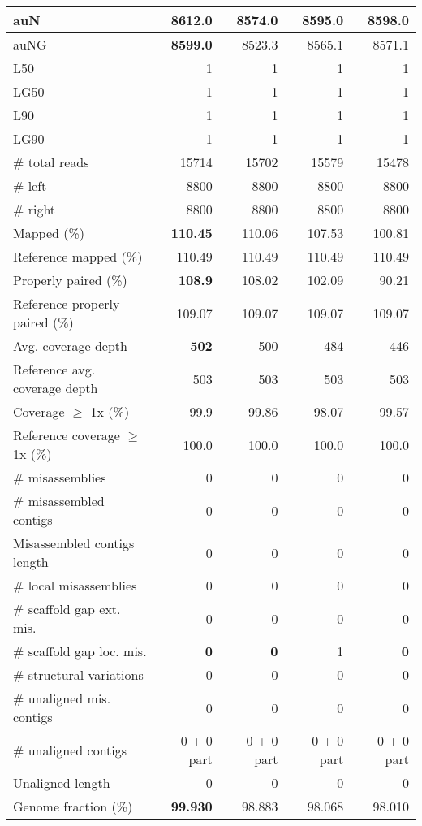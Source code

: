 \documentclass[12pt,a4paper]{article}
\begin{document}
\begin{table}[ht]
\begin{center}
\begin{tabular}{|l*{4}{|r}|}
auN & {\bf 8612.0} & 8574.0 & 8595.0 & 8598.0 \\ \hline
auNG & {\bf 8599.0} & 8523.3 & 8565.1 & 8571.1 \\ \hline
L50 & 1 & 1 & 1 & 1 \\ \hline
LG50 & 1 & 1 & 1 & 1 \\ \hline
L90 & 1 & 1 & 1 & 1 \\ \hline
LG90 & 1 & 1 & 1 & 1 \\ \hline
\# total reads & 15714 & 15702 & 15579 & 15478 \\ \hline
\# left & 8800 & 8800 & 8800 & 8800 \\ \hline
\# right & 8800 & 8800 & 8800 & 8800 \\ \hline
Mapped (\%) & {\bf 110.45} & 110.06 & 107.53 & 100.81 \\ \hline
Reference mapped (\%) & 110.49 & 110.49 & 110.49 & 110.49 \\ \hline
Properly paired (\%) & {\bf 108.9} & 108.02 & 102.09 & 90.21 \\ \hline
Reference properly paired (\%) & 109.07 & 109.07 & 109.07 & 109.07 \\ \hline
Avg. coverage depth & {\bf 502} & 500 & 484 & 446 \\ \hline
Reference avg. coverage depth & 503 & 503 & 503 & 503 \\ \hline
Coverage $\geq$ 1x (\%) & 99.9 & 99.86 & 98.07 & 99.57 \\ \hline
Reference coverage $\geq$ 1x (\%) & 100.0 & 100.0 & 100.0 & 100.0 \\ \hline
\# misassemblies & 0 & 0 & 0 & 0 \\ \hline
\# misassembled contigs & 0 & 0 & 0 & 0 \\ \hline
Misassembled contigs length & 0 & 0 & 0 & 0 \\ \hline
\# local misassemblies & 0 & 0 & 0 & 0 \\ \hline
\# scaffold gap ext. mis. & 0 & 0 & 0 & 0 \\ \hline
\# scaffold gap loc. mis. & {\bf 0} & {\bf 0} & 1 & {\bf 0} \\ \hline
\# structural variations & 0 & 0 & 0 & 0 \\ \hline
\# unaligned mis. contigs & 0 & 0 & 0 & 0 \\ \hline
\# unaligned contigs & 0 + 0 part & 0 + 0 part & 0 + 0 part & 0 + 0 part \\ \hline
Unaligned length & 0 & 0 & 0 & 0 \\ \hline
Genome fraction (\%) & {\bf 99.930} & 98.883 & 98.068 & 98.010 \\ \hline

\end{tabular}
\end{center}
\end{table}
\end{document}
